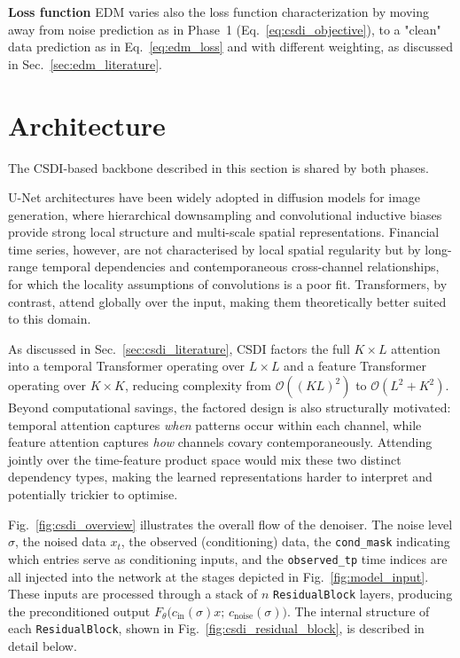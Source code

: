 \textbf{Loss function} \quad EDM varies also the loss function characterization by moving away from noise prediction as in Phase~1 (Eq.\ \ref{eq:csdi_objective}), to a "clean" data prediction as in Eq.\ \ref{eq:edm_loss} and with different weighting, as discussed in Sec.\ \ref{sec:edm_literature}.

\section{Architecture}
\label{sec:model_architecture}
The CSDI-based backbone described in this section is shared by both phases.

U-Net architectures \cite{ronneberger2015unet} have been widely adopted 
in diffusion models for image generation, where hierarchical downsampling 
and convolutional inductive biases provide strong local structure and 
multi-scale spatial representations. Financial time series, however, are 
not characterised by local spatial regularity but by long-range temporal 
dependencies and contemporaneous cross-channel relationships, for which 
the locality assumptions of convolutions is a poor fit. Transformers, by 
contrast, attend globally over the input, making them 
theoretically better suited to this domain. 

As discussed in Sec.\ \ref{sec:csdi_literature}, CSDI factors the full 
\(K \times L\) attention into a temporal Transformer operating over 
\(L \times L\) and a feature Transformer operating over \(K \times K\), 
reducing complexity from \(\mathcal{O}\!\left((KL)^2\right)\) to 
\(\mathcal{O}(L^2 + K^2)\). Beyond computational savings, the factored design is also 
structurally motivated: temporal attention captures \emph{when} patterns 
occur within each channel, while feature attention captures \emph{how} 
channels covary contemporaneously. Attending jointly over the time-feature 
product space would mix these two distinct dependency 
types, making the learned representations harder to interpret and 
potentially trickier to optimise.

Fig.\ \ref{fig:csdi_overview} illustrates the overall flow of the denoiser. The noise level \(\sigma\), the noised data \(x_t\), the observed (conditioning) data, the \texttt{cond\_mask} indicating which entries serve as conditioning inputs, and the \texttt{observed\_tp} time indices are all injected into the network at the stages depicted in Fig.\ \ref{fig:model_input}. These inputs are processed through a stack of \(n\) \texttt{ResidualBlock} layers, producing the preconditioned output \(F_\theta\bigl(c_{\text{in}}(\sigma)x;\, c_{\text{noise}}(\sigma)\bigr)\). The internal structure of each \texttt{ResidualBlock}, shown in Fig.\ \ref{fig:csdi_residual_block}, is described in detail below.

